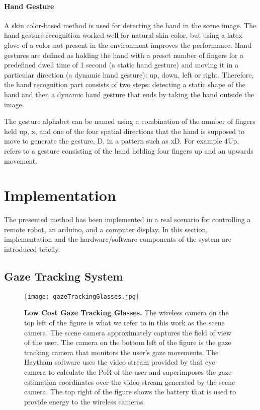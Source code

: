 \documentclass[jou,a4paper,notxfonts]{apa}
\begin{document}
\paragraph{Hand Gesture}
A skin color-based method is used for detecting the hand in the scene image. The hand gesture recognition worked well for natural skin color, but using a latex glove of a color not present in the environment improves the performance. Hand gestures are defined as holding the hand with a preset number of fingers for a predefined dwell time of 1 second (a static hand gesture) and moving it in a particular direction (a dynamic hand gesture): up, down, left  or right. Therefore, the hand recognition part consists of two steps: detecting a static shape of the hand and then a dynamic hand gesture that ends by taking the hand outside the image.
 
The gesture alphabet can be named using a combination of the number of fingers held up, x, and one of the four spatial directions that the hand is supposed to move to generate the gesture, D, in a pattern such as xD. For example 4Up, refers to a gesture consisting of the hand holding four fingers up and an upwards movement.

\section{Implementation}

The presented method has been implemented in a real scenario for controlling a remote robot, an arduino, and a computer display. In this section, implementation and the hardware/software components of the system are introduced briefly. 

\subsection{Gaze Tracking System}

\begin{figure}[tp]
 \texttt{[image: gazeTrackingGlasses.jpg]}
 \caption{\textbf{Low Cost Gaze Tracking Glasses.} The wireless camera on the top left of the figure is what we refer to in this work as the scene camera. The scene camera approximately captures the field of view of the user. The camera on the bottom left of the figure is the gaze tracking camera that monitors the user's gaze movements. The Haytham software uses the video stream provided by that eye camera to calculate the PoR of the user and superimposes the gaze estimation coordinates over the  video stream generated by the scene camera. The top right of the figure shows the battery that is used to provide energy to the wireless cameras.}
 \label{gazeTrackingGlasses}
\end{figure}
\end{document}
